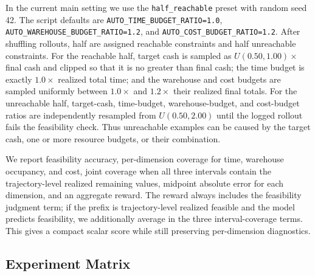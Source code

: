 In the current main setting we use the \texttt{half\_reachable} preset with random seed 42. The script defaults are \texttt{AUTO\_TIME\_BUDGET\_RATIO=1.0}, \texttt{AUTO\_WAREHOUSE\_BUDGET\_RATIO=1.2}, and \texttt{AUTO\_COST\_BUDGET\_RATIO=1.2}. After shuffling rollouts, half are assigned reachable constraints and half unreachable constraints. For the reachable half, target cash is sampled as $U(0.50,1.00)\times$ final cash and clipped so that it is no greater than final cash; the time budget is exactly $1.0\times$ realized total time; and the warehouse and cost budgets are sampled uniformly between $1.0\times$ and $1.2\times$ their realized final totals. For the unreachable half, target-cash, time-budget, warehouse-budget, and cost-budget ratios are independently resampled from $U(0.50,2.00)$ until the logged rollout fails the feasibility check. Thus unreachable examples can be caused by the target cash, one or more resource budgets, or their combination.

We report feasibility accuracy, per-dimension coverage for time, warehouse occupancy, and cost, joint coverage when all three intervals contain the trajectory-level realized remaining values, midpoint absolute error for each dimension, and an aggregate reward. The reward always includes the feasibility judgment term; if the prefix is trajectory-level realized feasible and the model predicts feasibility, we additionally average in the three interval-coverage terms. This gives a compact scalar score while still preserving per-dimension diagnostics.

\subsection{Experiment Matrix}
\label{sec:experiment-matrix}

